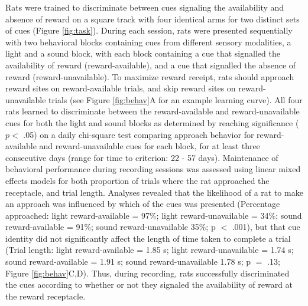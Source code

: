 \documentclass[11pt]{article}
\begin{document}
{Rats were trained to discriminate between cues signaling the
availability and absence of reward on a square track with four
identical arms for two distinct sets of cues (Figure
\ref{fig:task}). During each session, rats were presented sequentially
with two behavioral blocks containing cues from different sensory
modalities, a light and a sound block, with each block containing a
cue that signalled the availability of reward (reward-available), and
a cue that signalled the absence of reward (reward-unavailable). To
maximize reward receipt, rats should approach reward sites on
reward-available trials, and skip reward sites on reward-unavailable
trials (see Figure \ref{fig:behav}A for an example learning
curve). All four rats learned to discriminate between the
reward-available and reward-unavailable cues for both the light and
sound blocks as determined by reaching significance ($p <$ .05) on a
daily chi-square test comparing approach behavior for reward-available
and reward-unavailable cues for each block, for at least three
consecutive days (range for time to criterion: 22 - 57
days). Maintenance of behavioral performance during recording sessions
was assessed using linear mixed effects models for both proportion of
trials where the rat approached the receptacle, and trial
length. Analyses revealed that the likelihood of a rat to make an
approach was influenced by which of the cues was presented (Percentage
approached: light reward-available = 97\%; light reward-unavailable =
34\%; sound reward-available = 91\%; sound reward-unavailable 35\%; p
$<$ .001), but that cue identity did not significantly affect the
length of time taken to complete a trial (Trial length: light
reward-available = 1.85 s; light reward-unavailable = 1.74 s; sound
reward-available = 1.91 s; sound reward-unavailable 1.78 s; p $=$ .13;
Figure \ref{fig:behav}C,D). Thus, during recording, rats successfully
discriminated the cues according to whether or not they signaled the
availability of reward at the reward receptacle.

}
\end{document}
